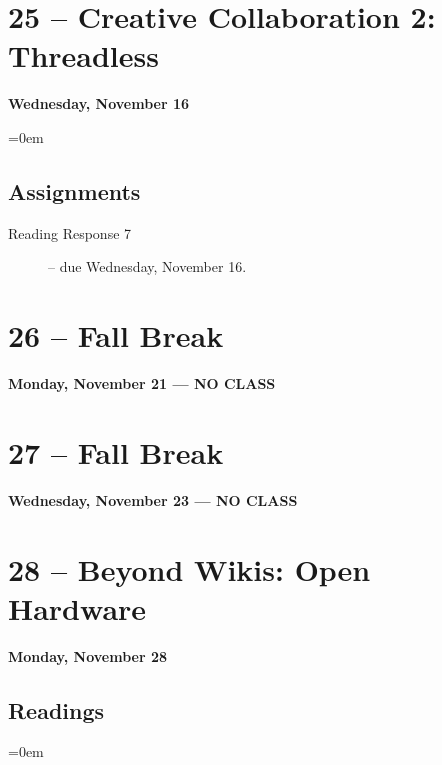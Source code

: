 \documentclass[11pt]{memoir}
\newenvironment{readinglist}{
\begin{list}{}{\leftmargin=8pt \itemindent=0em}
  \setlength{\itemsep}{8pt}
  \setlength{\parskip}{0em}
  \setlength{\parsep}{1em}
  \setlength{\parindent}{8em}}
{\end{list}}
\begin{document}
\section{25 -- Creative Collaboration 2: Threadless}
\textcolor{CUGold}{\textbf{Wednesday, November 16}}

\begin{readinglist}
    \item {}
    \item {}
\end{readinglist}
    
    \subsection{Assignments}
    \begin{description}%
        \item[Reading Response 7 ] -- due Wednesday, November 16. 
    \end{description}
    
\section{26 -- Fall Break}
\textcolor{CUGold}{\textbf{Monday, November 21  --- NO CLASS}}

\section{27 -- Fall Break}
\textcolor{CUGold}{\textbf{Wednesday, November 23 --- NO CLASS}}

\section{28 -- Beyond Wikis: Open Hardware}
\textcolor{CUGold}{\textbf{Monday, November 28}}

    \subsection{Readings}
    \begin{readinglist}
        \item {}
        \item {}
        \item {}
    \end{readinglist}
    
\end{document}
